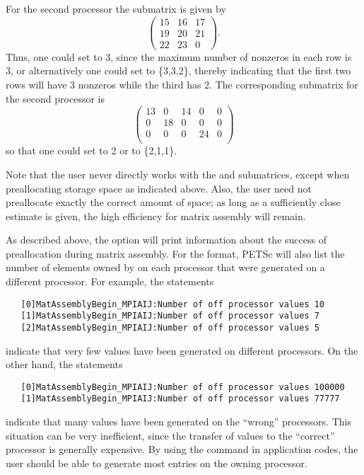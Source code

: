 For the second processor the  submatrix is given by 
{\small
\[
\left( \begin{array}{cccccccccc} 
 15 & 16 & 17 \\
 19 & 20 & 21 \\
 22 & 23 & 0  
\end{array} \right) .
\]
}
Thus, one could set  to 3, since the maximum number of
nonzeros in each row is 3, or alternatively one could set  to
\{3,3,2\}, thereby indicating that the first two rows will have 3
nonzeros while the third has 2. The corresponding  submatrix for the
second processor is
{\small
\[
\left( \begin{array}{cccccccccc} 
13 & 0  & 14 &  0  & 0  \\
0  & 18 & 0  &  0  & 0 \\
0  & 0  & 0  &  24 & 0 \\
\end{array} \right)
\]
}
so that one could set  to 2 or  to \{2,1,1\}.

Note that the user never directly works with the  and 
submatrices, except when preallocating storage space as indicated above.
Also, the user need not preallocate exactly the correct amount of
space; as long as a sufficiently close estimate is given, the high
efficiency for matrix assembly will remain.  

As described above, the option  
will print information about the success of preallocation during
matrix assembly.  For the  format, PETSc will also list
the number of elements owned by on each processor that were generated
on a different processor.  For example, the statements
\begin{verbatim}
   [0]MatAssemblyBegin_MPIAIJ:Number of off processor values 10
   [1]MatAssemblyBegin_MPIAIJ:Number of off processor values 7
   [2]MatAssemblyBegin_MPIAIJ:Number of off processor values 5
\end{verbatim}
indicate that very few values have been generated on different processors.
On the other hand, the statements
\begin{verbatim}
   [0]MatAssemblyBegin_MPIAIJ:Number of off processor values 100000
   [1]MatAssemblyBegin_MPIAIJ:Number of off processor values 77777
\end{verbatim}
indicate that many values have been generated on the ``wrong'' processors.
This situation can be very inefficient, since the transfer of values
to the ``correct'' processor is generally expensive.  By using the command
 in application codes, the user should be able
to generate most entries on the owning processor.

